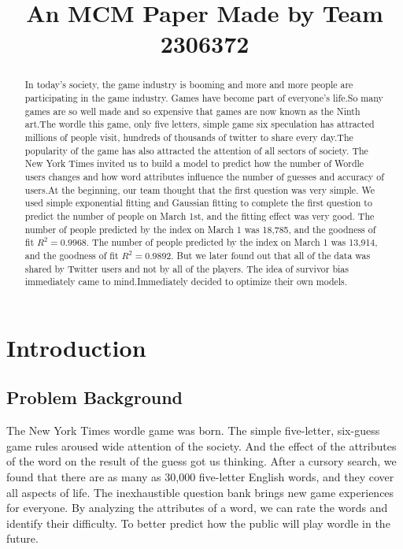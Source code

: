 \documentclass[12pt]{article}  %
\title{An MCM Paper Made by Team 2306372}  %
\begin{document}
\begin{abstract}
In today's society, the game industry is booming and more and more people are participating in the game industry. Games have become part of everyone's life.So many games are so well made and so expensive that games are now known as the Ninth art.The wordle this game, only five letters, simple game six speculation has attracted millions of people visit, hundreds of thousands of twitter to share every day.The popularity of the game has also attracted the attention of all sectors of society. The New York Times invited us to build a model to predict how the number of Wordle users changes and how word attributes influence the number of guesses and accuracy of users.At the beginning, our team thought that the first question was very simple. We used simple exponential fitting and Gaussian fitting to complete the first question to predict the number of people on March 1st, and the fitting effect was very good. The number of people predicted by the index on March 1 was 18,785, and the goodness of fit 
$R^2 = 0.9968$. 
The number of people predicted by the index on March 1 was 13,914, and the goodness of fit 
$R^2 = 0.9892$.
But we later found out that all of the data was shared by Twitter users and not by all of the players. The idea of survivor bias immediately came to mind.Immediately decided to optimize their own models.



\end{abstract}

\maketitle  %
\tableofcontents  %


\section{Introduction}
\subsection{Problem Background}
The New York Times wordle game was born. The simple five-letter, six-guess game rules aroused wide attention of the society. And the effect of the attributes of the word on the result of the guess got us thinking. After a cursory search, we found that there are as many as 30,000 five-letter English words, and they cover all aspects of life. The inexhaustible question bank brings new game experiences for everyone. By analyzing the attributes of a word, we can rate the words and identify their difficulty. To better predict how the public will play wordle in the future.
\end{document}
